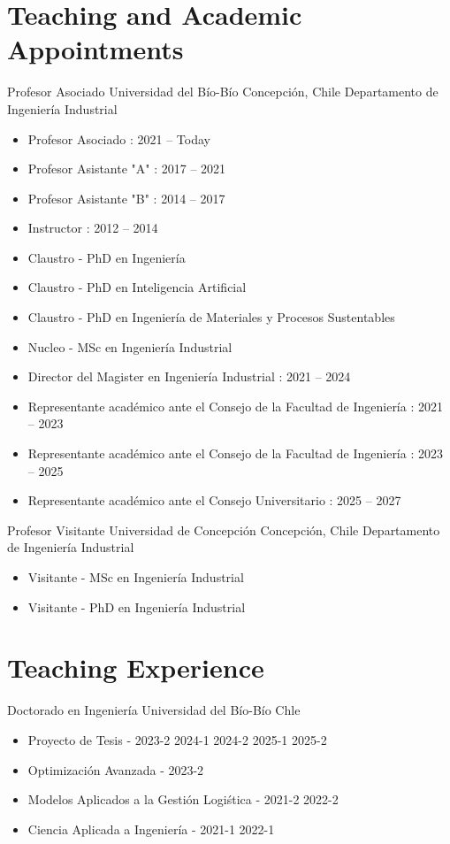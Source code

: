 \section{Teaching and Academic Appointments}

{Profesor Asociado}
{Universidad del B\'io-B\'io}
{Concepci\'on, Chile}
{Departamento de Ingenier\'ia Industrial}
{\begin{itemize}
\item Profesor Asociado      : 2021 -- Today
\item Profesor Asistante "A" : 2017 -- 2021
\item Profesor Asistante "B" : 2014 -- 2017
\item Instructor             : 2012 -- 2014
\item Claustro    - PhD en Ingenier\'ia
\item Claustro    - PhD en Inteligencia Artificial
\item Claustro    - PhD en Ingenier\'ia de Materiales y Procesos Sustentables
\item Nucleo      - MSc en Ingenier\'ia Industrial
\item Director del Magister en Ingenier\'ia Industrial                         : 2021 -- 2024
\item Representante acad\'emico ante el Consejo de la Facultad de Ingenier\'ia : 2021 -- 2023
\item Representante acad\'emico ante el Consejo de la Facultad de Ingenier\'ia : 2023 -- 2025
\item Representante acad\'emico ante el Consejo Universitario                  : 2025 -- 2027
\end{itemize}}

{Profesor Visitante}
{Universidad de Concepci\'on}
{Concepci\'on, Chile}
{Departamento de Ingenier\'ia Industrial}
{\begin{itemize}
\item Visitante - MSc en Ingenier\'ia Industrial
\item Visitante - PhD en Ingenier\'ia Industrial
\end{itemize}}

\section{Teaching Experience}


{Doctorado en Ingenier\'ia}
{Universidad del B\'io-B\'io}
{Chle}
{}
{\begin{itemize}
\item Proyecto de Tesis - 2023-2 2024-1 2024-2 2025-1 2025-2
\item Optimizaci\'on Avanzada - 2023-2
\item Modelos Aplicados a la Gesti\'on Logi\'stica - 2021-2 2022-2
\item Ciencia Aplicada a Ingenier\'ia - 2021-1 2022-1
\end{itemize}}

